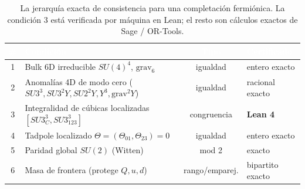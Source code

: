 \documentclass[11pt,a4paper]{article}
\begin{document}
\begin{table}[t]
\centering\footnotesize
\begin{tabular}{clcl}
\toprule
\rowcolor{hdrblue}
\textcolor{white}{\#} & \textcolor{white}{Condici\'on} & \textcolor{white}{Tipo} & \textcolor{white}{Certificado}\\
\midrule
\rowcolor{softgrey}
1 & Bulk 6D irreducible $SU(4)^4$, $\mathrm{grav}_6$ & igualdad & entero exacto\\
2 & Anomal\'ias 4D de modo cero ($SU3^3,SU3^2Y,SU2^2Y,Y^3,\mathrm{grav}^2Y$) & igualdad & racional exacto\\
\rowcolor{softgrey}
3 & Integralidad de c\'ubicas localizadas $[SU3_C^3,SU3_{123}^3]$ & congruencia & \textbf{\color{okgreen}Lean 4}\\
4 & Tadpole localizado $\Theta=(\Theta_{01},\Theta_{23})=0$ & igualdad & entero exacto\\
\rowcolor{softgrey}
5 & Paridad global $SU(2)$ (Witten) & mod 2 & exacto\\
6 & Masa de frontera (protege $Q,u,d$) & rango/emparej. & bipartito exacto\\
\bottomrule
\end{tabular}
\caption{La jerarqu\'ia exacta de consistencia para una completaci\'on fermi\'onica. La
condici\'on 3 est\'a verificada por m\'aquina en Lean; el resto son c\'alculos exactos de
Sage / OR-Tools.}
\label{tab:gates}
\end{table}
\end{document}
